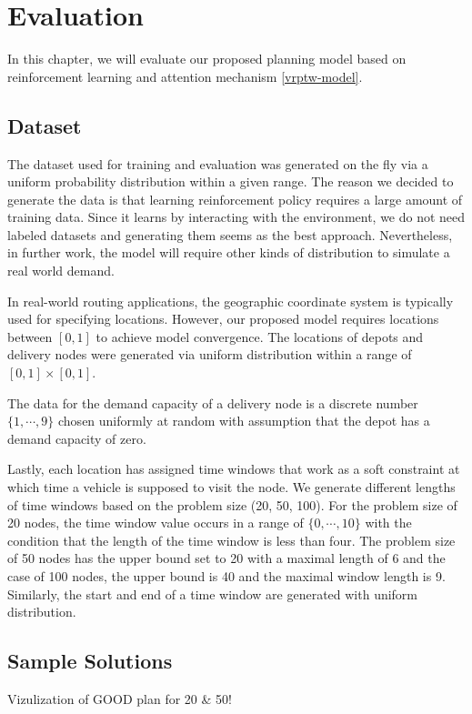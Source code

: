\chapter{Evaluation}

In this chapter, we will evaluate our proposed planning model based on reinforcement learning and attention mechanism \ref{vrptw-model}.

\section{Dataset}
The dataset used for training and evaluation was generated on the fly via a uniform probability distribution within a given range. The reason we decided to generate the data is that learning reinforcement policy requires a large amount of training data. Since it learns by interacting with the environment, we do not need labeled datasets and generating them seems as the best approach. Nevertheless, in further work, the model will require other kinds of distribution to simulate a real world demand.

In real-world routing applications, the geographic coordinate system is typically used for specifying locations. However, our proposed model requires locations between $[0, 1]$ to achieve model convergence. The locations of depots and delivery nodes were generated via uniform distribution within a range of $[0, 1] \times [0, 1]$.

The data for the demand capacity of a delivery node is a discrete number $\{1, \cdots, 9\}$ chosen uniformly at random with assumption that the depot has a demand capacity of zero.

Lastly, each location has assigned time windows that work as a soft constraint at which time a vehicle is supposed to visit the node. We generate different lengths of time windows based on the problem size (20, 50, 100). For the problem size of 20 nodes, the time window value occurs in a range of $\{0, \cdots, 10\}$ with the condition that the length of the time window is less than four. The problem size of 50 nodes has the upper bound set to 20 with a maximal length of 6 and the case of 100 nodes, the upper bound is 40 and the maximal window length is 9. Similarly, the start and end of a time window are generated with uniform distribution.

\section{Sample Solutions}
Vizulization of GOOD plan for 20 & 50!


